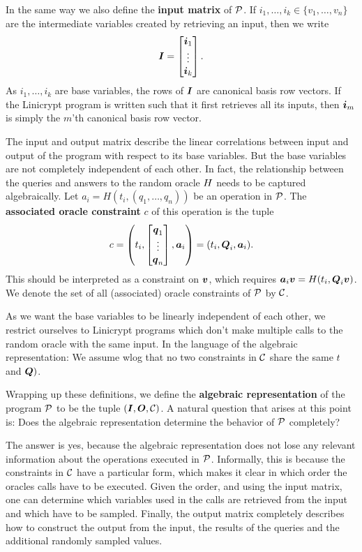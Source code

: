In the same way we also define the \textbf{input matrix} of $\P$.
If $i_1, \dots, i_k \in \{v_1, \dots, v_n\}$ are the intermediate variables created by retrieving an input,
then we write
\[
  \Inp = \begin{bmatrix}
  \v i_1 \\
  \vdots \\
  \v i_k
  \end{bmatrix}.
\]
As $i_1, \dots, i_k$ are base variables,
the rows of $\Inp$ are canonical basis row vectors.
If the Linicrypt program is written such that it first retrieves all its inputs,
then $\vi_m$ is simply the $m$'th canonical basis row vector. 

The input and output matrix describe the linear correlations between input and output of the program with respect to its base variables.
But the base variables are not completely independent of each other.
In fact, the relationship between the queries and answers to the random oracle $\H$ needs to be captured algebraically.
Let $a_i = H(t_i, (q_1, \dots, q_n))$ be an operation in $\P$.
The \textbf{associated oracle constraint} $c$ of this operation is the tuple
\[
  c = \left( t_i, \begin{bmatrix}
  \v q_1 \\
  \vdots \\
  \v q_n
  \end{bmatrix},
  \va_i \right)
	=
	(t_i, \Q_i, \va_i)
	.
\]
This should be interpreted as a constraint on $\vbase$, which requires
$\va_i \vbase = \H( t_i, \Q_i \vbase)$.
We denote the set of all (associated) oracle constraints of $\P$ by $\C$.

As we want the base variables to be linearly independent of each other,
we restrict ourselves to Linicrypt programs which don't make multiple calls to the random oracle with the same input.
In the language of the algebraic representation:
We assume wlog that no two constraints in $\C$ share the same $t$ and $\Q)$.

Wrapping up these definitions,
we define the \textbf{algebraic representation} of the program $\P$ to be the tuple $(\Inp, \O, \C)$.
A natural question that arises at this point is:
Does the algebraic representation determine the behavior of $\P$ completely?

The answer is yes, because the algebraic representation does not lose any relevant information about the operations executed in $\P$.
Informally, this is because the constraints in $\C$ have a particular form, which makes it clear in which order the oracles calls have to be executed.
Given the order, and using the input matrix, one can determine which variables used in the calls are retrieved from the input and which have to be sampled.
Finally, the output matrix completely describes how to construct the output from the input,
the results of the queries and the additional randomly sampled values. 

